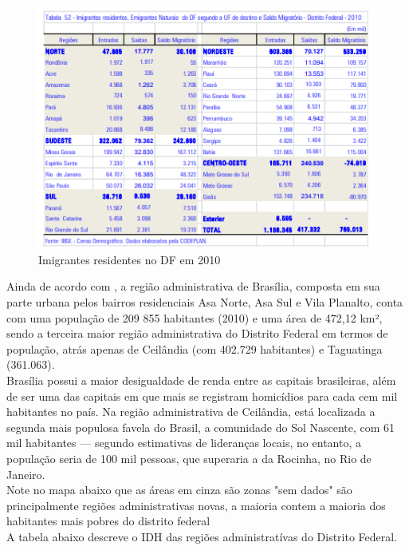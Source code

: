 \begin{figure}[h!]
    \centering
    \includegraphics{fig/imigrantes-2010}
    \caption{Imigrantes residentes no DF em 2010}
    \label{table:imigrantes-2010}
\end{figure}


Ainda de acordo com , a região administrativa de Brasília, composta em sua parte urbana pelos bairros residenciais Asa Norte, Asa Sul e Vila Planalto, conta com uma população de 209 855 habitantes (2010) e uma área de 472,12 km², sendo a terceira maior região administrativa do Distrito Federal em termos de população, atrás apenas de Ceilândia (com 402.729 habitantes) e Taguatinga (361.063).\\

Brasília possui a maior desigualdade de renda entre as capitais brasileiras, além de ser uma das capitais em que mais se registram homicídios para cada cem mil habitantes no país. Na região administrativa de Ceilândia, está localizada a segunda mais populosa favela do Brasil, a comunidade do Sol Nascente, com 61 mil habitantes — segundo estimativas de lideranças locais, no entanto, a população seria de 100 mil pessoas, que superaria a da Rocinha, no Rio de Janeiro.\\

Note no mapa abaixo que as áreas em cinza são zonas "sem dados" são principalmente regiões administrativas novas, a maioria contem a maioria dos habitantes mais pobres do distrito federal\\

A tabela abaixo descreve o IDH das regiões administratívas do Distrito Federal.\\


